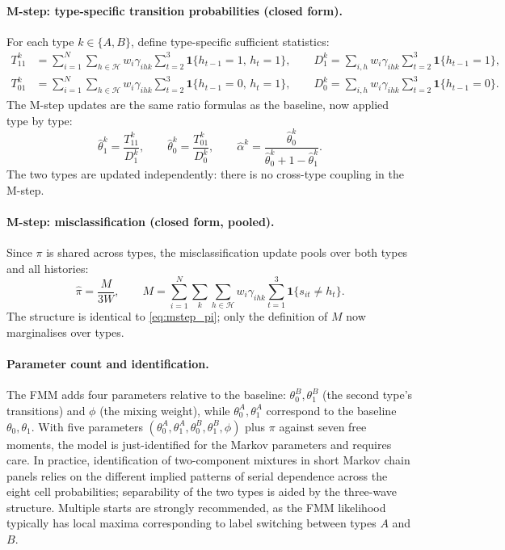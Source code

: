 \documentclass[12pt]{article}
\begin{document}
\paragraph{M-step: type-specific transition probabilities (closed form).}
For each type \(k \in \{A, B\}\), define type-specific sufficient
statistics:
\begin{align}
T_{11}^k &= \sum_{i=1}^{N} \sum_{h \in \mathcal{H}} w_i \gamma_{ihk}
  \sum_{t=2}^{3} \mathbf{1}\{h_{t-1} = 1,\, h_t = 1\}, \qquad
D_1^k = \sum_{i,h} w_i \gamma_{ihk}
  \sum_{t=2}^{3} \mathbf{1}\{h_{t-1} = 1\},
\label{eq:suff_T_fmm} \\
T_{01}^k &= \sum_{i=1}^{N} \sum_{h \in \mathcal{H}} w_i \gamma_{ihk}
  \sum_{t=2}^{3} \mathbf{1}\{h_{t-1} = 0,\, h_t = 1\}, \qquad
D_0^k = \sum_{i,h} w_i \gamma_{ihk}
  \sum_{t=2}^{3} \mathbf{1}\{h_{t-1} = 0\}.
\label{eq:suff_T01_fmm}
\end{align}
The M-step updates are the same ratio formulas as the baseline, now
applied type by type:
\begin{equation}
\hat{\theta}_1^k = \frac{T_{11}^k}{D_1^k}, \qquad
\hat{\theta}_0^k = \frac{T_{01}^k}{D_0^k}, \qquad
\hat{\alpha}^k = \frac{\hat{\theta}_0^k}{\hat{\theta}_0^k + 1 - \hat{\theta}_1^k}.
\label{eq:mstep_theta_fmm}
\end{equation}
The two types are updated independently: there is no cross-type coupling
in the M-step.

\paragraph{M-step: misclassification (closed form, pooled).}
Since \(\pi\) is shared across types, the misclassification update pools
over both types and all histories:
\begin{equation}
\hat{\pi} = \frac{M}{3W}, \qquad
M = \sum_{i=1}^{N} \sum_{k} \sum_{h \in \mathcal{H}}
  w_i \gamma_{ihk}
  \sum_{t=1}^{3} \mathbf{1}\{s_{it} \neq h_t\}.
\label{eq:mstep_pi_fmm}
\end{equation}
The structure is identical to \eqref{eq:mstep_pi}; only the definition
of \(M\) now marginalises over types.

\paragraph{Parameter count and identification.}
The FMM adds four parameters relative to the baseline:
\(\theta_0^B, \theta_1^B\) (the second type's transitions) and
\(\phi\) (the mixing weight), while \(\theta_0^A, \theta_1^A\)
correspond to the baseline \(\theta_0, \theta_1\). With five
parameters \((\theta_0^A, \theta_1^A, \theta_0^B, \theta_1^B, \phi)\)
plus \(\pi\) against seven free moments, the model is just-identified
for the Markov parameters and requires care. In practice, identification
of two-component mixtures in short Markov chain panels relies on the
different implied patterns of serial dependence across the eight cell
probabilities; separability of the two types is aided by the three-wave
structure. Multiple starts are strongly recommended, as the FMM
likelihood typically has local maxima corresponding to label switching
between types \(A\) and \(B\).
\end{document}

